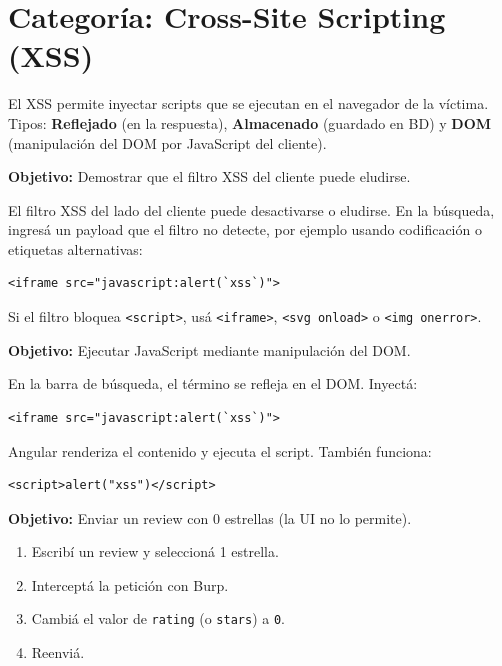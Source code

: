 \documentclass[11pt,a4paper]{article}
\begin{document}
\section{Categoría: Cross-Site Scripting (XSS)}

\begin{teoria}
El XSS permite inyectar scripts que se ejecutan en el navegador de la víctima. Tipos: \textbf{Reflejado} (en la respuesta), \textbf{Almacenado} (guardado en BD) y \textbf{DOM} (manipulación del DOM por JavaScript del cliente).
\end{teoria}

\begin{desafio}
\textbf{Objetivo:} Demostrar que el filtro XSS del cliente puede eludirse.
\begin{solucion}
El filtro XSS del lado del cliente puede desactivarse o eludirse. En la búsqueda, ingresá un payload que el filtro no detecte, por ejemplo usando codificación o etiquetas alternativas:
\begin{lstlisting}
<iframe src="javascript:alert(`xss`)">
\end{lstlisting}
Si el filtro bloquea \texttt{<script>}, usá \texttt{<iframe>}, \texttt{<svg onload>} o \texttt{<img onerror>}.
\end{solucion}
\end{desafio}

\begin{desafio}
\textbf{Objetivo:} Ejecutar JavaScript mediante manipulación del DOM.
\begin{solucion}
En la barra de búsqueda, el término se refleja en el DOM. Inyectá:
\begin{lstlisting}
<iframe src="javascript:alert(`xss`)">
\end{lstlisting}
Angular renderiza el contenido y ejecuta el script. También funciona:
\begin{lstlisting}
<script>alert("xss")</script>
\end{lstlisting}
\end{solucion}
\end{desafio}

\begin{desafio}
\textbf{Objetivo:} Enviar un review con 0 estrellas (la UI no lo permite).
\begin{solucion}
\begin{enumerate}[leftmargin=*]
  \item Escribí un review y seleccioná 1 estrella.
  \item Interceptá la petición con Burp.
  \item Cambiá el valor de \texttt{rating} (o \texttt{stars}) a \texttt{0}.
  \item Reenviá.
\end{enumerate}
\end{solucion}
\end{desafio}
\end{document}
